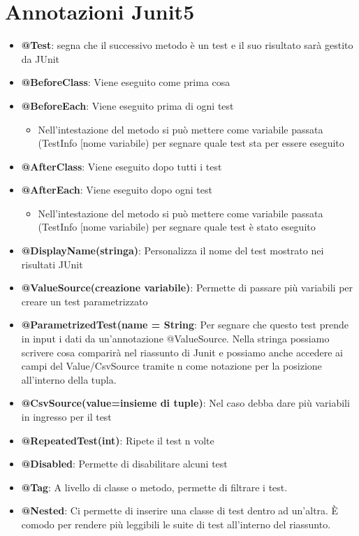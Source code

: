 \documentclass[11pt,a4paper]{book}
\begin{document}
\section{Annotazioni Junit5}
\begin{itemize}
	\item \textbf{@Test}: segna che il successivo metodo è un test e il suo risultato sarà gestito da JUnit
	\item \textbf{@BeforeClass}: Viene eseguito come prima cosa
	\item \textbf{@BeforeEach}: Viene eseguito prima di ogni test
		\begin{itemize}
			\item[] Nell'intestazione del metodo si può mettere come variabile passata (TestInfo [nome variabile) per segnare quale test sta per essere eseguito
		\end{itemize}
	\item \textbf{@AfterClass}: Viene eseguito dopo tutti i test
	\item \textbf{@AfterEach}: Viene eseguito dopo ogni test
		\begin{itemize}
			\item[] Nell'intestazione del metodo si può mettere come variabile passata (TestInfo [nome variabile) per segnare quale test è stato eseguito
		\end{itemize}
	\item \textbf{@DisplayName(stringa)}: Personalizza il nome del test mostrato nei risultati JUnit
	\item \textbf{@ValueSource(creazione variabile)}: Permette di passare più variabili per creare un test parametrizzato
	\item \textbf{@ParametrizedTest(name = String}: Per segnare che questo test prende in input i dati da un'annotazione @ValueSource. Nella stringa possiamo scrivere cosa comparirà nel riassunto di Junit e possiamo anche accedere ai campi del Value/CsvSource tramite {n} come notazione per la posizione all'interno della tupla.
	\item \textbf{@CsvSource(value={insieme di tuple})}: Nel caso debba dare più variabili in ingresso per il test
	\item \textbf{@RepeatedTest(int)}: Ripete il test n volte
	\item \textbf{@Disabled}: Permette di disabilitare alcuni test
	\item \textbf{@Tag}: A livello di classe o metodo, permette di filtrare i test.
	\item \textbf{@Nested}: Ci permette di inserire una classe di test dentro ad un'altra. È comodo per rendere più leggibili le suite di test all'interno del riassunto.
\end{itemize}
\end{document}
